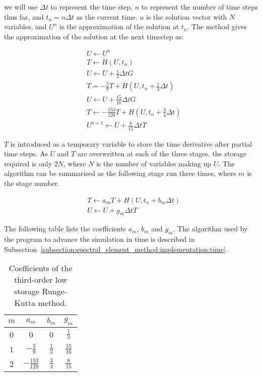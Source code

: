 \noindent
we will use $\Delta t$ to represent the time step, $n$ to represent the number of time steps thus
far, and $t_n = n \Delta t$ as the current time. $u$ is the solution vector with $N$ variables, and
$U^n$ is the approximation of the solution at $t_n$. The method gives the approximation of the
solution at the next timestep as:

\begin{equation} \label{equ:runge_kutta}
	\begin{split}
		& U \leftarrow U^n \\
		& T \leftarrow H \left( U, t_n \right) \\
		& U \leftarrow U + \frac{1}{3} \Delta t G \\
		& T = -\frac{5}{9} T + H \left( U, t_n + \frac{1}{3} \Delta t \right) \\
		& U \leftarrow U + \frac{15}{16} \Delta t G \\
		& T \leftarrow -\frac{153}{128} T + H \left( U, t_n + \frac{3}{4} \Delta t \right) \\
		& U^{n + 1} \leftarrow U + \frac{8}{15} \Delta t T
	\end{split}
\end{equation}

$T$ is introduced as a temporary variable to store the time derivative after partial time steps. As
$U$ and $T$ are overwritten at each of the three stages, the storage required is only $2 N$, where
$N$ is the number of variables making up $U$. The algorithm can be summarised as the following stage
run three times, where $m$ is the stage number.

\begin{equation} \label{equ:runge_kutta_stage}
	\begin{split}
		& T \leftarrow a_m T + H \left( U, t_n + b_m \Delta t \right) \\
		& U \leftarrow U + g_m \Delta t T
	\end{split}
\end{equation}

The following table lists the coefficients $a_m$, $b_m$ and $g_m$. The algorithm used by the program
to advance the simulation in time is described in
Subsection~\ref{subsection:spectral_element_method:implementation:time}. 

\begin{table}[H]
	\centering
	\begin{tabular}{c c c c}
		$m$ & $a_m$ & $b_m$ & $g_m$ \\
		\hline
		0 & 0 & 0 & $\frac{1}{3}$ \\
		1 & $-\frac{5}{9}$ & $\frac{1}{3}$ & $\frac{15}{16}$ \\
		2 & $-\frac{153}{128}$ & $\frac{3}{4}$ & $\frac{8}{15}$ \\
	\end{tabular}
	\caption{Coefficients of the third-order low storage Runge-Kutta method.}
	\label{table:runge_kutta_coefficient}
\end{table}

